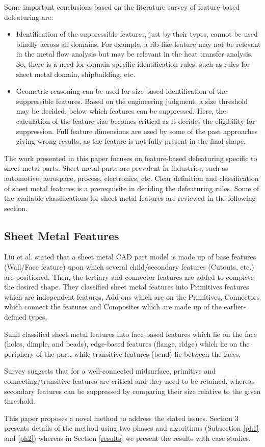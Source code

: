Some important conclusions based on the literature survey of feature-based defeaturing are:
\begin{itemize}
[noitemsep,topsep=2pt,parsep=2pt,partopsep=2pt,label=\textbullet]
\item Identification of the suppressible features, just by their types, cannot be used blindly across all domains. For example, a rib-like feature may not be relevant in the metal flow analysis but may be relevant in the heat transfer analysis. So, there is a need for domain-specific identification rules, such as rules for sheet metal domain, shipbuilding, etc.
\item  Geometric reasoning can be used for size-based identification of the suppressible features. Based on the engineering judgment, a size threshold may be decided, below which features can be suppressed. Here, the calculation of the feature size becomes critical as it decides the eligibility for suppression. Full feature dimensions are used by some of the past approaches \cite{Kang2013} \cite{Russ2012} giving wrong results, as the feature is not fully present in the final shape. 
\end{itemize}
The work presented in this paper focuses on feature-based defeaturing specific to sheet metal parts. Sheet metal parts are prevalent in industries, such as automotive, aerospace, process, electronics, etc. Clear definition and classification of sheet metal features is a prerequisite in deciding the defeaturing rules. Some of the available classifications for sheet metal features are reviewed in the following section.

	
\subsection{Sheet Metal Features}

Liu et al. \cite{Liu2004} stated that a sheet metal CAD part model is made up of base features (Wall/Face feature) upon which several child/secondary features (Cutouts, etc.) are positioned. Then, the tertiary and connector features are added to complete the desired shape. They classified sheet metal features into Primitives features which are independent features, Add-ons which are on the Primitives, Connectors which connect the features and Composites which are made up of the earlier-defined types.

Sunil \cite{Sunil2008} classified sheet metal features into face-based features which lie on the face (holes, dimple, and beads), edge-based features (flange, ridge) which lie on the periphery of the part, while transitive features (bend) lie between the faces.

Survey suggests that for a well-connected midsurface, primitive and connecting/transitive features are critical and they need to be retained, whereas secondary features can be suppressed by comparing their size relative to the given threshold. 

This paper proposes a novel method to address the stated issues. Section 3 presents details of the method using two phases and algorithms (Subsection \ref{ph1} and \ref{ph2}) whereas in Section \ref{results} we present the results with case studies.

